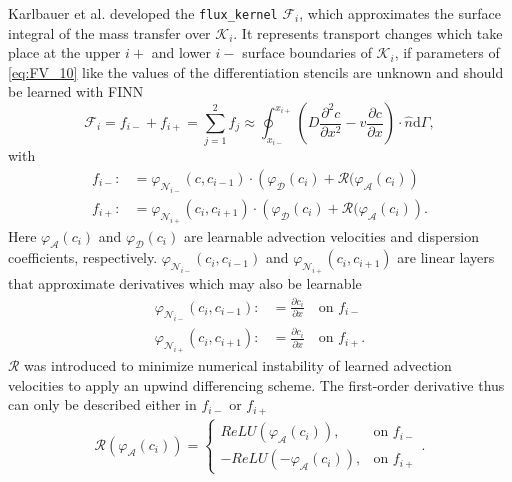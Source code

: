 Karlbauer et al. developed the \texttt{flux\_kernel} $\mathcal{F}_i$, which approximates the surface integral of the mass transfer over $\mathcal{K}_i$. It represents transport changes which take place at the upper $i+$ and lower $i-$ surface boundaries of $\mathcal{K}_i$, if parameters of \ref{eq:FV_10} like the values of the differentiation stencils are unknown and should be learned with FINN
\begin{equation}
    \mathcal{F}_i = f_{i-} + f_{i+} = \sum_{j=1}^2 f_j \approx \oint_{x_{i-}}^{x_{i+}} \left(D \frac{\partial^2c}{\partial x^2}-v\frac{\partial c}{\partial x}\right)\cdot \hat{n}\mathrm{d}\Gamma,
\end{equation}
with
\begin{align}
        f_{i-} :&= \varphi_{\mathcal{N}_{i-}}(c, c_{i-1}) \cdot \left(\varphi_\mathcal{D}(c_i) + \mathcal{R}(\varphi_{\mathcal{A}}(c_i)\right) \\
        f_{i+} :&= \varphi_{\mathcal{N}_{i+}}(c_i, c_{i+1}) \cdot \left(\varphi_\mathcal{D}(c_i) + \mathcal{R}(\varphi_{\mathcal{A}}(c_i)\right).
\end{align}
Here $\varphi_{\mathcal{A}}(c_i)$ and $\varphi_{\mathcal{D}}(c_i)$ are learnable advection velocities and dispersion coefficients, respectively. $\varphi_{\mathcal{N}_{i-}}(c_i, c_{i-1})$ and $\varphi_{\mathcal{N}_{i+}}(c_i, c_{i+1})$ are linear layers that approximate derivatives which may also be learnable
\begin{align}
        \varphi_{\mathcal{N}_{i-}}(c_i, c_{i-1}) :&= \frac{\partial c_i}{\partial x} \quad \text{on $f_{i-}$}\\ 
        \varphi_{\mathcal{N}_{i+}}(c_i, c_{i+1}) :&= \frac{\partial c_i}{\partial x} \quad \text{on $f_{i+}$}.
\end{align}
$\mathcal{R}$ was introduced to minimize numerical instability of learned advection velocities to apply an upwind differencing scheme. The first-order derivative thus can only be described either in $f_{i-}$ or $f_{i+}$
\begin{align}
     \mathcal{R}(\varphi_{\mathcal{A}}(c_i)) = \left\{\begin{array}{ll} ReLU(\varphi_{\mathcal{A}}(c_i)), & \text{on $f_{i-}$} \\ -ReLU(-\varphi_{\mathcal{A}}(c_i)), & \text{on $f_{i+}$}\end{array}\right. .
\end{align}
